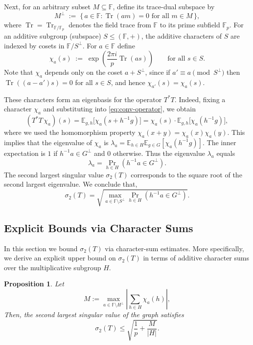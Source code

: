 \documentclass[11pt]{article}
\theoremstyle{plain}
\newtheorem{proposition}[theorem]{Proposition}
\theoremstyle{definition}
\newcommand{\Tr}{\operatorname{Tr}}
\begin{document}
Next, for an arbitrary subset $M\subseteq \mathbb{F}$, define its trace-dual subspace by
\[
M^\perp \;:=\; \{\,a\in \mathbb{F} : \Tr(am)=0 \text{ for all } m\in M\,\},
\]
where $\Tr=\Tr_{\mathbb{F}/\mathbb{F}_p}$ denotes the field trace from $\mathbb{F}$ to its prime subfield $\mathbb{F}_p$.
For an additive subgroup (subspace) $S\le (\mathbb{F},+)$, the additive characters of $S$ are indexed by cosets in $\mathbb{F}/S^\perp$. For $a\in \mathbb{F}$ define
\[
\chi_a(s)\;:=\;\exp\!\left(\frac{2\pi i}{p}\Tr(as)\right)\qquad\text{for all } s\in S.
\]
Note that $\chi_a$ depends only on the coset $a+S^\perp$, since if $a'\equiv a \pmod{S^\perp}$ then $\Tr((a-a')s)=0$ for all $s\in S$, and hence $\chi_{a'}(s)=\chi_a(s)$.

These characters form an eigenbasis for the operator $T^*T$. Indeed, fixing a character $\chi_a$ and substituting into \eqref{eq:conv-operator}, we obtain
\[
(T^*T\,\chi_a)(s)
=
\mathbb{E}_{g,h}\big[\chi_a(s+h^{-1}g)\big]
=
\chi_a(s)\cdot \mathbb{E}_{g,h}\big[\chi_a(h^{-1}g)\big],
\]
where we used the homomorphism property $\chi_a(x+y)=\chi_a(x)\chi_a(y)$.
This implies that the eigenvalue of $\chi_a$ is $\lambda_a = \mathbb{E}_{h \in H} \mathbb{E}_{g \in G} [\chi_a(h^{-1}g)]$.
 The inner expectation is $1$ if $h^{-1}a \in G^\perp$ and $0$ otherwise.
 Thus the eigenvalue $\lambda_a$ equals
\[
    \lambda_a = \Pr_{h \in H} (h^{-1}a \in  G^\perp).
\]
The second largest singular value $\sigma_2(T)$ corresponds to the square root of the second largest eigenvalue. We conclude that,
\begin{equation}
\label{eq:sigma_2_characterization}
    \sigma_2(T) = \sqrt{\max_{a \in \mathbb{F}\setminus S^\perp} \Pr_{h \in H} (h^{-1}a \in  G^\perp)}.
\end{equation}

\subsection{Explicit Bounds via Character Sums}
In this section we bound $\sigma_2(T)$ via character-sum estimates. More specifically, we derive an explicit upper bound on $\sigma_2(T)$ in terms of additive character sums over the multiplicative subgroup $H$.

\begin{proposition}
\label{prop:general-bound}
    Let 
    \[
        M := \max_{a\in \mathbb{F}\setminus H^\perp } \left| \sum_{h \in H} \chi_a(h) \right|,
    \]
    Then, the second largest singular value of the graph satisfies
    \[
        \sigma_2(T) \le \sqrt{ \frac{1}{p} +  \frac{M}{|H|} }.
    \]
\end{proposition}
\end{document}
